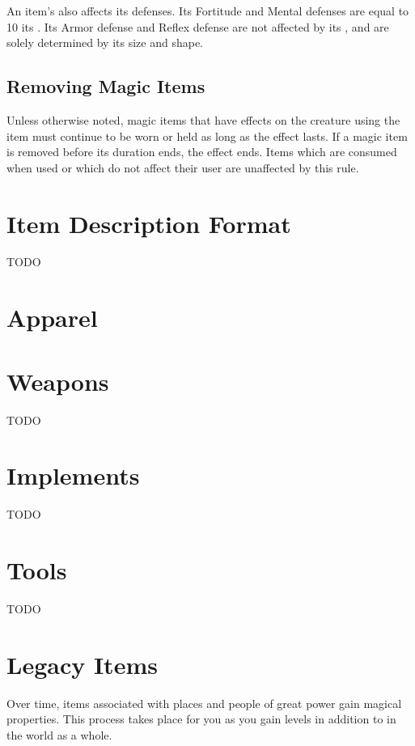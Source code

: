         An item's  also affects its defenses.
        Its Fortitude and Mental defenses are equal to 10 \add its .
        Its Armor defense and Reflex defense are not affected by its , and are solely determined by its size and shape.

    \subsection{Removing Magic Items}
        Unless otherwise noted, magic items that have effects on the creature using the item must continue to be worn or held as long as the effect lasts.
        If a magic item is removed before its duration ends, the effect ends.
        Items which are consumed when used or which do not affect their user are unaffected by this rule.

\section{Item Description Format}
    TODO

\section{Apparel}

    

\section{Weapons} %

    TODO

\section{Implements}

    TODO

\section{Tools}

    TODO

\section{Legacy Items}\label{Legacy Items}

    Over time, items associated with places and people of great power gain magical properties.
    This process takes place for you as you gain levels in addition to in the world as a whole.

